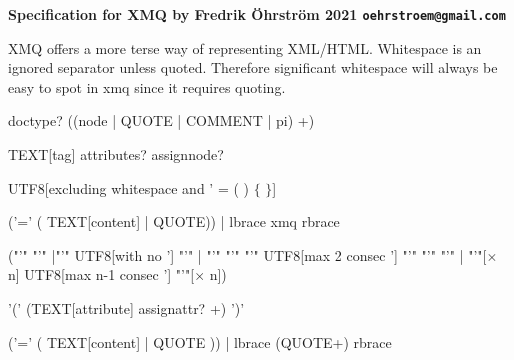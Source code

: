 \documentclass[10pt,a4paper]{article}
\begin{document}
\textbf{Specification for XMQ by Fredrik Öhrström 2021 \texttt{oehrstroem@gmail.com}}

\vspace{5mm}

XMQ offers a more terse way of representing XML/HTML. Whitespace is an
ignored separator unless quoted. Therefore significant
whitespace will always be easy to spot in xmq since it requires
quoting.

\raisebox{45pt}{xmq:}
\begin{minipage}{15cm}
\begin{rail}
  doctype? ((node | QUOTE | COMMENT | pi) +)
\end{rail}
\end{minipage}

\raisebox{8pt}{node:}
\begin{minipage}{15cm}
\begin{rail}
  TEXT[tag] attributes? assignnode?
\end{rail}
\end{minipage}

\raisebox{-4pt}{TEXT:}
\begin{minipage}{15cm}
\begin{rail}
UTF8[excluding whitespace and ' = ( ) $\lbrace$ $\rbrace$]
\end{rail}
\end{minipage}

\raisebox{20pt}{assignnode:}
\begin{minipage}{15cm}
\begin{rail}
  ('=' ( TEXT[content] | QUOTE)) | lbrace xmq rbrace
\end{rail}
\end{minipage}

\raisebox{32pt}{QUOTE:}
\begin{minipage}{15cm}
\begin{rail}
  ("'" "'"
  |"'" UTF8[with no '] "'"
  | "'" "'" "'" UTF8[max 2 consec '] "'" "'" "'"
  | "'"[$\times$ n] UTF8[max n-1 consec '] "'"[$\times$ n])
\end{rail}
\end{minipage}

\raisebox{20pt}{attributes:}
\begin{minipage}{15cm}
\begin{rail}
'(' (TEXT[attribute] assignattr? +)  ')'
\end{rail}
\end{minipage}

\raisebox{32pt}{assignattr:}
\begin{minipage}{15cm}
\begin{rail}
  ('=' ( TEXT[content] | QUOTE )) | lbrace (QUOTE+) rbrace
\end{rail}
\end{minipage}
\end{document}
